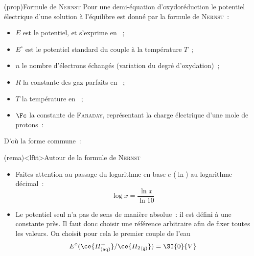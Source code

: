 \documentclass[../../main/main.tex]{subfiles}
\begin{document}
\begin{tcb*}[breakable](prop){Formule de \textsc{Nernst}}
	Pour une demi-équation d'oxydoréduction
	\psw{
	\[
		\ce{\alpha Red + \beta H_2O_{\rm(l)} = \gamma Ox + \delta {H}^+_{\rm(aq)} +}
		ne^-
	\]
	}
	le potentiel électrique d'une solution à l'équilibre est donné par la formule
	de \textsc{Nernst}~:
	\psw{
		\[
			E(\ce{Ox}/\ce{Red}) = E^\circ(\ce{Ox}/\ce{Red}) +
			\frac{RT}{n\Fc} \ln
			\frac{a_{\ce{Ox}}^{\gamma}[\ce{H+}]^{\delta}}
			{a_{\ce{Red}}^{\alpha}{c^\circ}^{\delta}}
		\]
	}
	\vspace{-20pt}
	\begin{itemize}
		\item $E$ est le potentiel, et s'exprime en ~;
		\item $E^\circ$ est le potentiel standard du couple à la température $T$~;
		\item $n$ le nombre d'électrons échangés (variation du degré d'oxydation)~;
		\item $R$ la constante des gaz parfaits en ~;
		\item $T$ la température en ~;
		\item $\Fc$ la constante de \textsc{Faraday}, représentant la charge
		      électrique d'une mole de protons~:
		      \psw{
			      \[
				      \Fc = e \Nc_A = \SI{96485}{C.mol^{-1}}
				      \quad \Ra \quad
				      \boxed{\frac{RT}{\Fc}\ln 10 \approx \SI{0.059}{V}}
			      \]
		      }
		      \vspace{-30pt}
	\end{itemize}
	D'où la forme commune~:
	\psw{
		\[
			\boxed{
				E(\ce{Ox}/\ce{Red}) = E^\circ(\ce{Ox}/\ce{Red}) +
				\frac{\num{0.06}}{n} \log
				\frac{a_{\ce{Ox}}^{\gamma}[\ce{H+}]^{\delta}}
				{a_{\ce{Red}}^{\alpha}{c^\circ}^{\delta}}
			}
		\]
	}
	\vspace{-15pt}
\end{tcb*}

\begin{tcb*}(rema)<lftt>{Autour de la formule de \textsc{Nernst}}
	\begin{itemize}
		\item Faites attention au passage du logarithme en base $e$ ($\ln$) au
		      logarithme décimal~:
		      \[
			      \log x = \frac{\ln x}{\ln 10}
		      \]
		\item Le potentiel seul n'a pas de sens de manière absolue~: il est défini
		      à une constante près. Il faut donc choisir une référence arbitraire afin
		      de fixer toutes les valeurs. On choisit pour cela le premier couple de
		      l'eau
		      \[
			      E^\circ(\ce{{H}^+_{\rm(aq)}}/\ce{{H_2}_{\rm(g)}}) = \SI{0}{V}
		      \]
	\end{itemize}
\end{tcb*}
\end{document}
